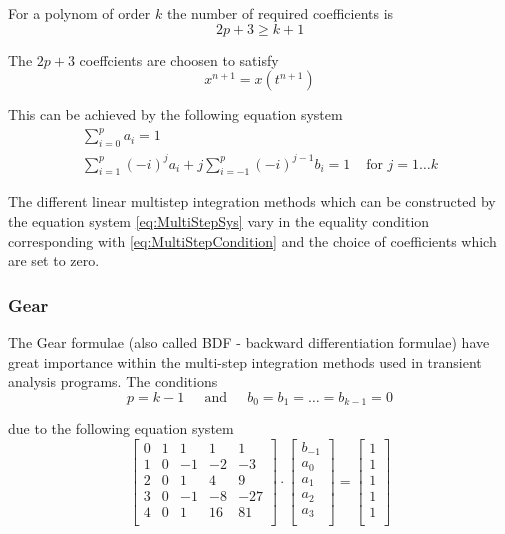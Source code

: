For a polynom of order $k$ the number of required coefficients is
\begin{equation}
\label{eq:MultiStepCondition}
2p + 3 \ge k + 1
\end{equation}

The $2p +3$ coeffcients are choosen to satisfy
\begin{equation}
x^{n+1} = x(t^{n+1})
\end{equation}

This can be achieved by the following equation system
\begin{subequations}
\label{eq:MultiStepSys}
\begin{align}
\label{eq:MultiStepSysA}
\sum^p_{i=0} a_i = 1\\
\sum^p_{i=1} (-i)^j a_i + j \sum^p_{i=-1} (-i)^{j-1} b_i = 1 & \textrm{ for } j = 1\ldots k
\end{align}
\end{subequations}

The different linear multistep integration methods which can be
constructed by the equation system \eqref{eq:MultiStepSys} vary in the
equality condition corresponding with \eqref{eq:MultiStepCondition}
and the choice of coefficients which are set to zero.

\subsubsection{Gear}

The Gear \cite{Gear} formulae (also called BDF - backward
differentiation formulae) have great importance within the multi-step
integration methods used in transient analysis programs.  The
conditions
\begin{equation}
p = k - 1
\;\;\;\; \textrm{ and } \;\;\;\;
b_0 = b_1 = \ldots = b_{k-1} = 0
\end{equation}

due to the following equation system
\begin{equation}
\label{eq:GearCoeff}
\left[\begin{array}{lrrrr}
0 & 1 &  1 &  1 &   1\\
1 & 0 & -1 & -2 &  -3\\
2 & 0 &  1 &  4 &   9\\
3 & 0 & -1 & -8 & -27\\
4 & 0 &  1 & 16 &  81\\
\end{array}\right]
\cdot
\begin{bmatrix}
b_{-1}\\
a_0\\
a_1\\
a_2\\
a_3\\
\end{bmatrix}
=
\begin{bmatrix}
1\\
1\\
1\\
1\\
1\\
\end{bmatrix}
\end{equation}


